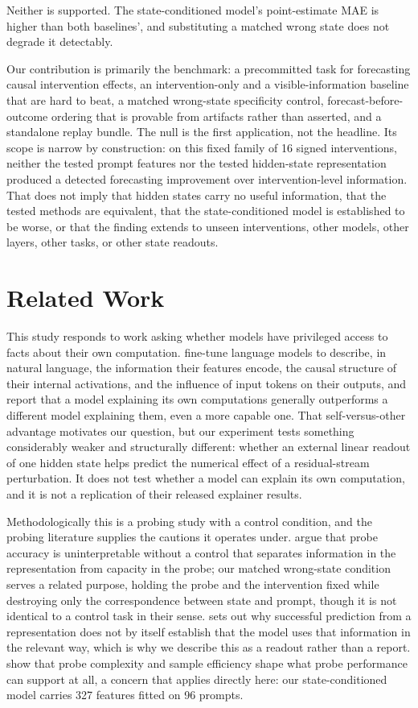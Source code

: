 \documentclass{article}
\begin{document}
Neither is supported. The state-conditioned model's point-estimate MAE is higher than both
baselines', and substituting a matched wrong state does not degrade it detectably.

Our contribution is primarily the benchmark: a precommitted task for forecasting causal
intervention effects, an intervention-only and a visible-information baseline that are hard to
beat, a matched wrong-state specificity control, forecast-before-outcome ordering that is provable
from artifacts rather than asserted, and a standalone replay bundle. The null is the first
application, not the headline. Its scope is narrow by construction: on this fixed family of 16
signed interventions, neither the tested prompt features nor the tested hidden-state representation
produced a detected forecasting improvement over intervention-level information. That does not
imply that hidden states carry no useful information, that the tested methods are equivalent, that
the state-conditioned model is established to be worse, or that the finding extends to unseen
interventions, other models, other layers, other tasks, or other state readouts.

\section{Related Work}

This study responds to work asking whether models have privileged access to facts about their own
computation. \citet{li2025explain} fine-tune language models to describe, in natural language, the
information their features encode, the causal structure of their internal activations, and the
influence of input tokens on their outputs, and report that a model explaining its own computations
generally outperforms a different model explaining them, even a more capable one. That
self-versus-other advantage motivates our question, but our experiment tests something considerably
weaker and structurally different: whether an external linear readout of one hidden state helps
predict the numerical effect of a residual-stream perturbation. It does not test whether a model can
explain its own computation, and it is not a replication of their released explainer results.

Methodologically this is a probing study with a control condition, and the probing literature
supplies the cautions it operates under. \citet{hewitt2019control} argue that probe accuracy is
uninterpretable without a control that separates information in the representation from capacity in
the probe; our matched wrong-state condition serves a related purpose, holding the probe and the
intervention fixed while destroying only the correspondence between state and prompt, though it is
not identical to a control task in their sense. \citet{belinkov2022probing} sets out why successful
prediction from a representation does not by itself establish that the model uses that information
in the relevant way, which is why we describe this as a readout rather than a report.
\citet{voita2020mdl} show that probe complexity and sample efficiency shape what probe performance
can support at all, a concern that applies directly here: our state-conditioned model carries 327
features fitted on 96 prompts.
\end{document}
